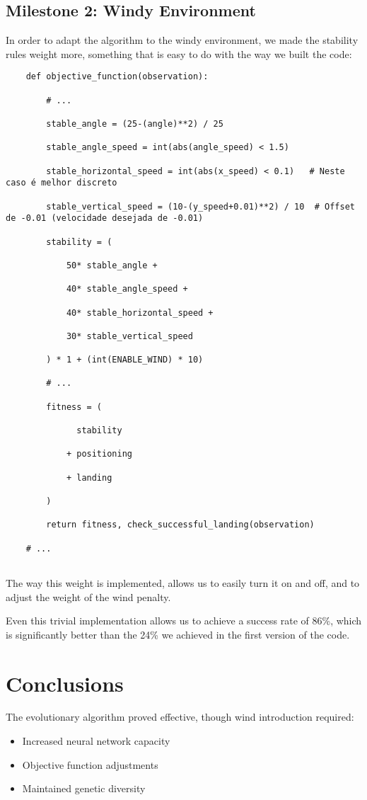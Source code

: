 \documentclass{article}
\begin{document}
\subsection{Milestone 2: Windy Environment}
In order to adapt the algorithm to the windy environment, we made the stability rules weight more, something that is easy to do with the way we built the code:
\begin{lstlisting}
    def objective_function(observation):

        # ...

        stable_angle = (25-(angle)**2) / 25

        stable_angle_speed = int(abs(angle_speed) < 1.5)

        stable_horizontal_speed = int(abs(x_speed) < 0.1)   # Neste caso é melhor discreto

        stable_vertical_speed = (10-(y_speed+0.01)**2) / 10  # Offset de -0.01 (velocidade desejada de -0.01)

        stability = (

            50* stable_angle +

            40* stable_angle_speed +

            40* stable_horizontal_speed +

            30* stable_vertical_speed

        ) * 1 + (int(ENABLE_WIND) * 10)

        # ...

        fitness = (

              stability

            + positioning

            + landing

        )

        return fitness, check_successful_landing(observation)

    # ...


\end{lstlisting}


The way this weight is implemented, allows us to easily turn it on and off, and to adjust the weight of the wind penalty.


Even this trivial implementation allows us to achieve a success rate of 86\%, which is significantly better than the 24\% we achieved in the first version of the code.


\section{Conclusions}
The evolutionary algorithm proved effective, though wind introduction required:
\begin{itemize}
    \item Increased neural network capacity
    \item Objective function adjustments
    \item Maintained genetic diversity
\end{itemize}
\end{document}

